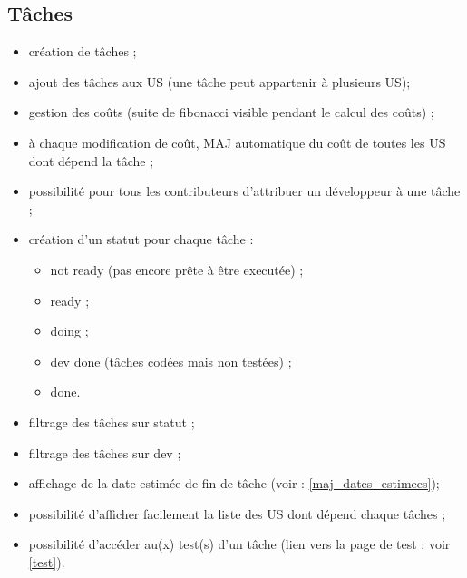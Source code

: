 \subsection{T\^aches}
\begin{itemize}
\item cr\'eation de t\^aches\label{tache} ;
\item ajout des t\^aches aux US (une t\^ache peut appartenir \`a plusieurs US);
\item gestion des co\^uts (suite de fibonacci visible pendant le calcul des co\^uts) ;
\item \`a chaque modification de co\^ut, MAJ automatique du co\^ut de toutes les US dont d\'epend la t\^ache ;
\item possibilit\'e pour tous les contributeurs d'attribuer un d\'eveloppeur \`a une t\^ache ;
\item  cr\'eation d'un statut pour chaque t\^ache :
\begin{itemize}
\item not ready (pas encore pr\^ete \`a \^etre execut\'ee) ;
\item ready ;
\item doing ;
\item dev done (t\^aches cod\'ees mais non test\'ees) ;
\item done.
\end{itemize}
\item filtrage des t\^aches sur statut ;
\item filtrage des t\^aches sur dev ;
\item affichage de la date estim\'ee de fin de t\^ache (voir : \ref{maj_dates_estimees});
\item possibilit\'e d'afficher facilement la liste des US dont d\'epend chaque t\^aches ;
\item possibilit\'e d'acc\'eder au(x) test(s) d'un t\^ache (lien vers la page de test : voir \ref{test}).
\end{itemize}

